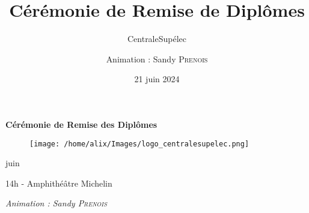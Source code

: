 \documentclass{beamer}
\title[Cérémonie de Remise de Diplômes - 21 juin 2024]{Cérémonie de Remise de Diplômes}
\subtitle{CentraleSupélec }
\author{Animation : Sandy \textsc{Prenois}}
\institute{14h - Amphithéâtre Michelin}
\date{21 juin 2024}
\begin{document}

\begin{frame}[plain]
  \begin{center}
    \vspace*{0.5cm}
    {\LARGE \textbf{Cérémonie de Remise des Diplômes}} \\
    \vspace*{0.3cm}
    {\Large 
    \begin{figure}
      \texttt{[image: /home/alix/Images/logo\_centralesupelec.png]}
    \end{figure}
    
    \vspace*{0.5cm}
     juin  \\
    }
    
    \vspace*{0.3cm}
    14h - Amphithéâtre Michelin \\
    \vspace*{0.7cm}
    
    \textit{ Animation : Sandy \textsc{Prenois}}
  \end{center}

\end{frame}



\end{document}
